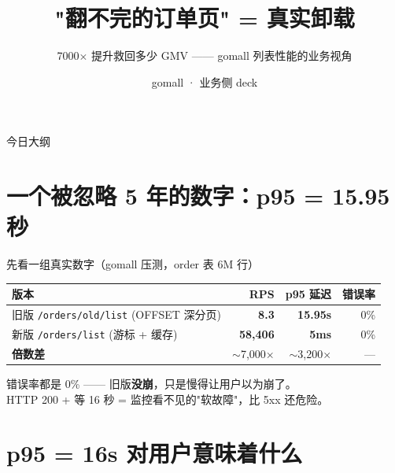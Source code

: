 

\title{"翻不完的订单页" = 真实卸载}
\subtitle{7000$\times$ 提升救回多少 GMV —— gomall 列表性能的业务视角}
\author{gomall · 业务侧 deck}
\date{}



\maketitle

\begin{frame}{今日大纲}
\tableofcontents
\end{frame}

\section{一个被忽略 5 年的数字：p95 = 15.95 秒}

\begin{frame}{先看一组真实数字（gomall 压测，order 表 6M 行）}
\begin{tabular}{@{}lrrr@{}}
\toprule
版本 & RPS & p95 延迟 & 错误率 \\
\midrule
旧版 \texttt{/orders/old/list} (OFFSET 深分页)
  & \textbf{8.3}    & \textbf{15.95s} & 0\% \\
新版 \texttt{/orders/list} (游标 + 缓存)
  & \textbf{58{,}406} & \textbf{5ms}    & 0\% \\
\midrule
\textbf{倍数差} & $\sim$7{,}000$\times$ & $\sim$3{,}200$\times$ & — \\
\bottomrule
\end{tabular}
\vspace{3mm}
\small 错误率都是 0\% —— 旧版\textbf{没崩}，只是慢得让用户以为崩了。\\
HTTP 200 + 等 16 秒 = 监控看不见的"软故障"，比 5xx 还危险。
\end{frame}

\section{p95 = 16s 对用户意味着什么}

